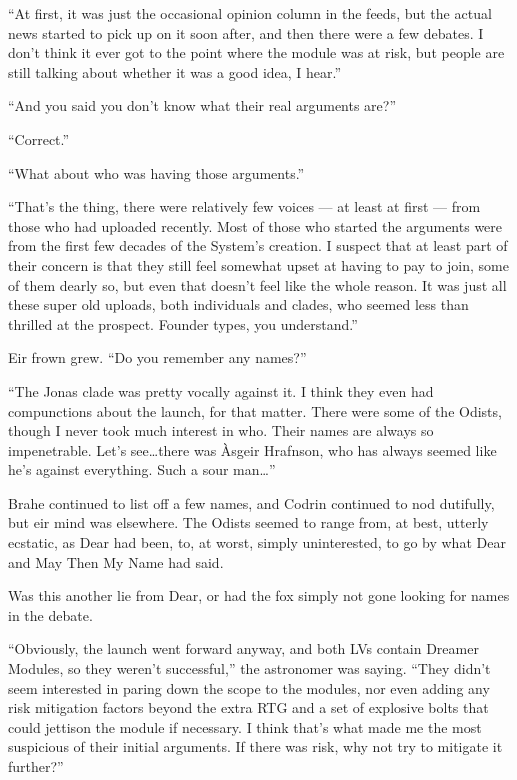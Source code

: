 ``At first, it was just the occasional opinion column in the feeds, but the actual news started to pick up on it soon after, and then there were a few debates. I don't think it ever got to the point where the module was at risk, but people are still talking about whether it was a good idea, I hear.''

``And you said you don't know what their real arguments are?''

``Correct.''

``What about who was having those arguments.''

``That's the thing, there were relatively few voices — at least at first — from those who had uploaded recently. Most of those who started the arguments were from the first few decades of the System's creation. I suspect that at least part of their concern is that they still feel somewhat upset at having to pay to join, some of them dearly so, but even that doesn't feel like the whole reason. It was just all these super old uploads, both individuals and clades, who seemed less than thrilled at the prospect. Founder types, you understand.''

Eir frown grew. ``Do you remember any names?''

``The Jonas clade was pretty vocally against it. I think they even had compunctions about the launch, for that matter. There were some of the Odists, though I never took much interest in who. Their names are always so impenetrable. Let's see\ldots there was Àsgeir Hrafnson, who has always seemed like he's against everything. Such a sour man\ldots{}''

Brahe continued to list off a few names, and Codrin continued to nod dutifully, but eir mind was elsewhere. The Odists seemed to range from, at best, utterly ecstatic, as Dear had been, to, at worst, simply uninterested, to go by what Dear and May Then My Name had said.

Was this another lie from Dear, or had the fox simply not gone looking for names in the debate.

``Obviously, the launch went forward anyway, and both LVs contain Dreamer Modules, so they weren't successful,'' the astronomer was saying. ``They didn't seem interested in paring down the scope to the modules, nor even adding any risk mitigation factors beyond the extra RTG and a set of explosive bolts that could jettison the module if necessary. I think that's what made me the most suspicious of their initial arguments. If there was risk, why not try to mitigate it further?''

